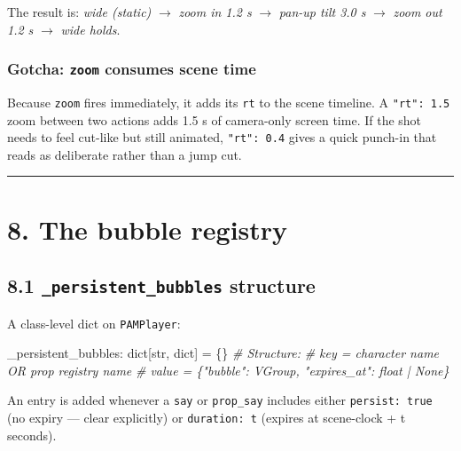 \documentclass[
  12pt,
  letterpaper,
]{book}
\newenvironment{Shaded}{}{}
\newcommand{\BuiltInTok}[1]{\textcolor[rgb]{0.00,0.50,0.00}{#1}}
\newcommand{\CommentTok}[1]{\textcolor[rgb]{0.38,0.63,0.69}{\textit{#1}}}
\newcommand{\NormalTok}[1]{#1}
\newcommand{\OperatorTok}[1]{\textcolor[rgb]{0.40,0.40,0.40}{#1}}
\begin{document}
The result is: \emph{wide (static)} $\to$ \emph{zoom in 1.2 s} $\to$
\emph{pan-up tilt 3.0 s} $\to$ \emph{zoom out 1.2 s} $\to$ \emph{wide
holds}.

\subsubsection{Gotcha: \texttt{zoom} consumes scene time}\label{zoom-consumes-time}

Because \texttt{zoom} fires immediately, it adds its \texttt{rt} to the
scene timeline. A \texttt{"rt": 1.5} zoom between two actions adds 1.5 s
of camera-only screen time. If the shot needs to feel
cut-like but still animated, \texttt{"rt": 0.4} gives a quick punch-in
that reads as deliberate rather than a jump cut.

\begin{center}\rule{0.5\linewidth}{0.5pt}\end{center}

\section{8. The bubble registry}\label{the-bubble-registry}

\subsection{\texorpdfstring{8.1 \texttt{\_persistent\_bubbles}
structure}{8.1 \_persistent\_bubbles structure}}\label{persistent_bubbles-structure}

A class-level dict on \texttt{PAMPlayer}:

\begin{Shaded}
\begin{Highlighting}[]
\NormalTok{\_persistent\_bubbles: }\BuiltInTok{dict}\NormalTok{[}\BuiltInTok{str}\NormalTok{, }\BuiltInTok{dict}\NormalTok{] }\OperatorTok{=}\NormalTok{ \{\}}
\CommentTok{\# Structure:}
\CommentTok{\#   key   = character name OR prop registry name}
\CommentTok{\#   value = \{"bubble": VGroup, "expires\_at": float | None\}}
\end{Highlighting}
\end{Shaded}

An entry is added whenever a \texttt{say} or \texttt{prop\_say} includes
either \texttt{persist:\ true} (no expiry --- clear explicitly) or
\texttt{duration:\ t} (expires at scene-clock + t seconds).
\end{document}
